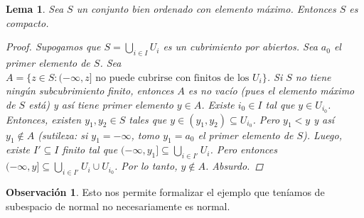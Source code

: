 \documentclass[12pt]{book}
\newtheorem{lem}[teo]{Lema}
\theoremstyle{definition}
\newtheorem{obs}[teo]{Observación}
\begin{document}
\begin{lem}
Sea $S$ un conjunto bien ordenado con elemento máximo.  Entonces $S$ es compacto.
\begin{proof}
Supogamos que $S=\displaystyle\bigcup_{i\in I} U_i$ es un cubrimiento por abiertos. Sea $a_0$ el primer elemento de $S$. Sea $A=\{z\in S : (-\infty,z]\text{ no puede cubrirse con finitos de los }U_i\}$. Si $S$ no tiene ningún subcubrimiento finito, entonces $A$ es no vacío (pues el elemento máximo de $S$ está) y así tiene primer elemento $y\in A$. Existe $i_0\in I$ tal que $y\in U_{i_0}$. Entonces, existen $y_1,y_2\in S$ tales que $y\in (y_1,y_2)\subseteq U_{i_0}$. Pero $y_1<y$ y así $y_1\notin A$ (sutileza: si $y_1=-\infty$, tomo $y_1=a_0$ el primer elemento de $S$). Luego, existe $I'\subseteq I$ finito tal que $(-\infty,y_1]\subseteq \displaystyle\bigcup_{i\in I'} U_i$. Pero entonces $(-\infty,y]\subseteq \displaystyle\bigcup_{i\in I'}U_i \cup U_{i_0}$. Por lo tanto, $y\notin A$. Absurdo.
\end{proof}
\end{lem}

\begin{obs}
Esto nos permite formalizar el ejemplo que teníamos de subespacio de normal no necesariamente es normal.
\end{obs}
\end{document}
